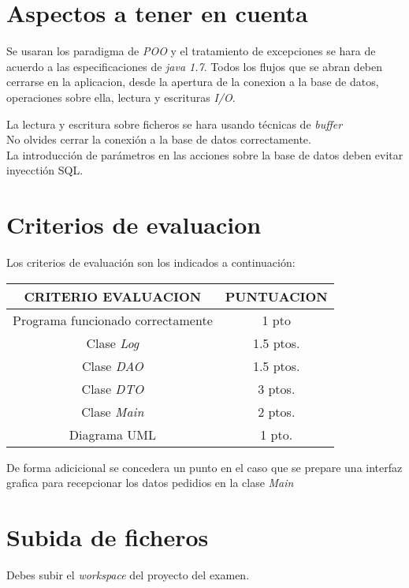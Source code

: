 \documentclass[4paper]{article}
\begin{document}
\section*{Aspectos a tener en cuenta}
Se usaran los paradigma de \emph{POO} y el tratamiento de excepciones se hara de acuerdo a las especificaciones de \emph{java 1.7}. Todos los flujos que se abran deben cerrarse en la aplicacion, desde la apertura de la conexion a la base de datos, operaciones sobre ella, lectura y escrituras \emph{I/O}.\par
La lectura y escritura sobre ficheros se hara usando técnicas de \emph{buffer}\\
No olvides cerrar la conexión a la base de datos correctamente.\\
La introducción de parámetros en las acciones sobre la base de datos deben evitar inyecctión SQL.

\section*{Criterios de evaluacion}
Los criterios de evaluación son los indicados a continuación:\par 
\vspace*{0.5cm}
\begin{tabular}{|c|c|}
\hline
\textbf{CRITERIO EVALUACION} & \textbf{PUNTUACION} \\
\hline
Programa funcionado correctamente & 1 pto\\
\hline
Clase \emph{Log} & 1.5 ptos.\\
\hline
Clase \emph{DAO} & 1.5 ptos.\\
\hline
Clase \emph{DTO} & 3 ptos.\\
\hline
Clase \emph{Main} & 2 ptos.\\
\hline
Diagrama UML & 1 pto.\\
\hline

\end{tabular}
\par 
\vspace{0.3cm}
De forma adicicional se concedera un punto en el caso que se prepare una interfaz grafica para recepcionar los datos pedidios en la clase \emph{Main}
\section*{Subida de ficheros}
Debes subir el \emph{workspace} del proyecto del examen.
\end{document}
